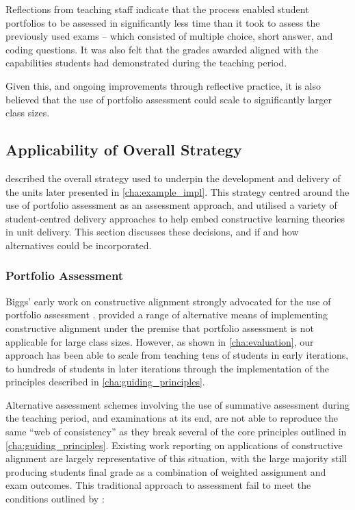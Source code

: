 Reflections from teaching staff indicate that the process enabled student portfolios to be assessed in significantly less time than it took to assess the previously used exams -- which consisted of multiple choice, short answer, and coding questions. It was also felt that the grades awarded aligned with the capabilities students had demonstrated during the teaching period.

Given this, and ongoing improvements through reflective practice, it is also believed that the use of portfolio assessment could scale to significantly larger class sizes.



\subsection{Applicability of Overall Strategy} %
\label{sub:overall_strategy}

 described the overall strategy used to underpin the development and delivery of the units later presented in \cref{cha:example_impl}. This strategy centred around the use of portfolio assessment as an assessment approach, and utilised a variety of  student-centred delivery approaches to help embed constructive learning theories in unit delivery. This section discusses these decisions, and if and how alternatives could be incorporated.

\subsubsection{Portfolio Assessment} %
 \label{ssub:portfolio_assessment}

Biggs' early work on constructive alignment strongly advocated for the use of portfolio assessment \cite{Biggs:1996c,Biggs:1999}. \citet{Biggs:2007} provided a range of alternative means of implementing constructive alignment under the premise that portfolio assessment is not applicable for large class sizes. However, as shown in \cref{cha:evaluation}, our approach has been able to scale from teaching tens of students in early iterations, to hundreds of students in later iterations through the implementation of the principles described in \cref{cha:guiding_principles}.

Alternative assessment schemes involving the use of summative assessment during the teaching period, and examinations at its end, are not able to reproduce the same ``web of consistency'' as they break several of the core principles outlined in \cref{cha:guiding_principles}. Existing work reporting on applications of constructive alignment are largely representative of this situation, with the large majority still producing students final grade as a combination of weighted assignment and exam outcomes. This traditional approach to assessment fail to meet the conditions outlined by \citet{Biggs:1996c}:

